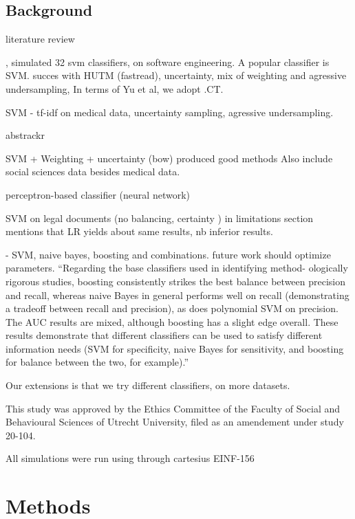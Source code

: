 \documentclass[
]{article}
\begin{document}
\hypertarget{background}{%
\subsection{Background}\label{background}}

\autocite{OMara-Eves2015} literature review

\autocite{Yu2018a}, \autocite{Yu2019} simulated 32 svm classifiers, on
software engineering. A popular classifier is SVM. succes with HUTM
(fastread), uncertainty, mix of weighting and agressive undersampling,
In terms of Yu et al, we adopt .CT.

SVM - tf-idf on medical data, uncertainty sampling, agressive
undersampling. \autocite{Wallace2010}

abstrackr

SVM + Weighting + uncertainty (bow) produced good methods
\autocite{Miwa2014} Also include social sciences data besides medical
data.

\autocite{Cohen2006} perceptron-based classifier (neural network)

SVM on legal documents (no balancing, certainty ) \autocite{Cormack2014}
in limitations section mentions that LR yields about same results, nb
inferior results.

\autocite{Kilicoglu2009} - SVM, naive bayes, boosting and combinations.
future work should optimize parameters. ``Regarding the base classifiers
used in identifying method- ologically rigorous studies, boosting
consistently strikes the best balance between precision and recall,
whereas naive Bayes in general performs well on recall (demonstrating a
tradeoff between recall and precision), as does polynomial SVM on
precision. The AUC results are mixed, although boosting has a slight
edge overall. These results demonstrate that different classifiers can
be used to satisfy different information needs (SVM for specificity,
naive Bayes for sensitivity, and boosting for balance between the two,
for example).''

Our extensions is that we try different classifiers, on more datasets.

This study was approved by the Ethics Committee of the Faculty of Social
and Behavioural Sciences of Utrecht University, filed as an amendement
under study 20-104.

All simulations were run using through cartesius EINF-156

\newpage

\hypertarget{methods-1}{%
\section{Methods}\label{methods-1}}
\end{document}
